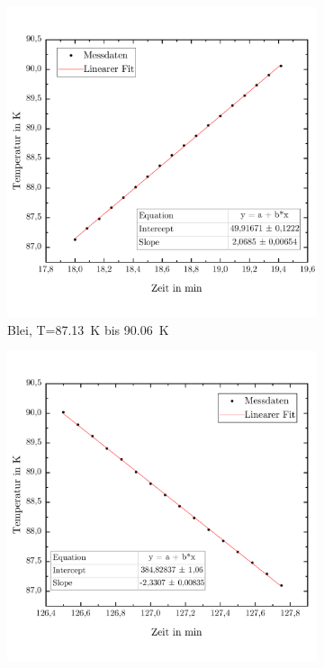 \documentclass[parskip=half, a4paper,twoside,final]{article}
\begin{document}
\begin{figure}[ht!]
  \centering
  \begin{subfigure}[b!]{0.49\textwidth}
    \vspace{-.5cm}
    \includegraphics[width=\textwidth]{Bilder/87_13__90_06__Anstieg.pdf}
    \vspace{-1cm}
    \caption{Blei, T=\SI{87,13}{\kelvin} bis \SI{90,06}{\kelvin}}
  \end{subfigure}
  \hfill
  \begin{subfigure}[b!]{0.49\textwidth}
    \vspace{-.5cm}
    \includegraphics[width=\textwidth]{Bilder/90_02_87_10__Abfall.pdf}

\end{subfigure}
\end{figure}
\end{document}
